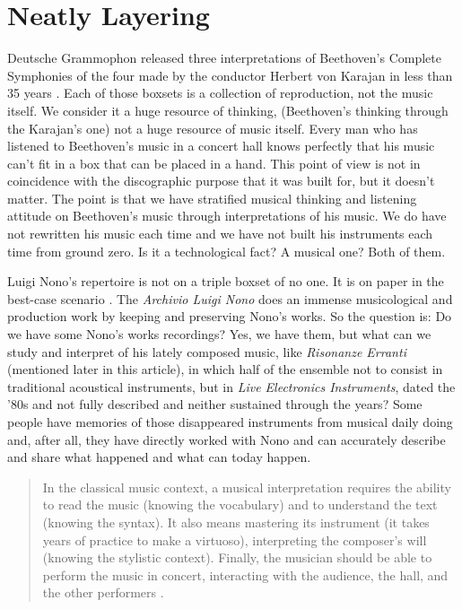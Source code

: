 \documentclass[twoside,a4paper]{article}
\begin{document}
\section{Neatly Layering}
\label{sec:layering}

Deutsche Grammophon released three interpretations of Beethoven's Complete
Symphonies of the four made by the conductor Herbert von Karajan in less than
35 years \cite{rrrnyt}. Each of those boxsets is a collection of reproduction,
not the music itself. We consider it a huge resource of thinking, (Beethoven's
thinking through the Karajan's one) not a huge resource of music itself. Every
man who has listened to Beethoven's music in a concert hall knows perfectly that
his music can't fit in a box that can be placed in a hand. This point of view is
not in coincidence with the discographic purpose that it was built for, but it
doesn't matter. The point is that we have stratified musical thinking and
listening attitude on Beethoven's music through interpretations of his music.
We do have not rewritten his music each time and we have not built his instruments
each time from ground zero. Is it a technological fact? A musical one? Both of
them.

Luigi Nono's repertoire is not on a triple boxset of no one. It is on paper in
the best-case scenario \cite{raprmt}. The \emph{Archivio Luigi Nono} does an
immense musicological and production work by keeping and preserving Nono's works.
So the question is: Do we have some Nono's works recordings? Yes, we have them,
but what can we study and interpret of his lately composed music, like
\emph{Risonanze Erranti} (mentioned later in this article), in which half of the
ensemble not to consist in traditional acoustical instruments, but in
\emph{Live Electronics Instruments}, dated the '80s and not fully described and
neither sustained through the years? Some people have memories of those
disappeared instruments from musical daily doing and, after all, they have
directly worked with Nono and can accurately describe and share what happened
and what can today happen.

\begin{quote}
In the classical music context, a musical interpretation requires the ability to
read the music (knowing the vocabulary) and to understand the text (knowing the
syntax). It also means mastering its instrument (it takes years of practice to
make a virtuoso), interpreting the composer's will (knowing the stylistic context).
Finally, the musician should be able to perform the music in concert, interacting
with the audience, the hall, and the other performers \cite{lem16}.
\end{quote}
\end{document}
